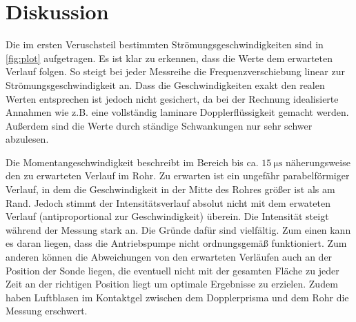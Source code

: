 \section{Diskussion}
\label{sec:Diskussion}
Die im ersten Veruschsteil bestimmten Strömungsgeschwindigkeiten sind in \autoref{fig:plot} aufgetragen.
Es ist klar zu erkennen, dass die Werte dem erwarteten Verlauf folgen.
So steigt bei jeder Messreihe die Frequenzverschiebung linear zur Strömungsgeschwindigkeit an.
Dass die Geschwindigkeiten exakt den realen Werten entsprechen ist jedoch nicht
gesichert, da bei der Rechnung idealisierte Annahmen wie z.B. eine vollständig laminare
Dopplerflüssigkeit gemacht werden. Außerdem sind die Werte durch ständige Schwankungen nur sehr schwer abzulesen.


Die Momentangeschwindigkeit beschreibt im Bereich bis ca. $\qty{15}{\micro\second}$ näherungsweise den zu erwarteten Verlauf im
Rohr. Zu erwarten ist ein ungefähr parabelförmiger Verlauf, in dem die Geschwindigkeit in der Mitte des Rohres größer ist als am Rand.  
Jedoch stimmt der Intensitätsverlauf absolut nicht mit dem 
erwateten Verlauf (antiproportional zur Geschwindigkeit) überein. Die Intensität steigt während der Messung stark an.
Die Gründe dafür sind vielfältig.
Zum einen kann es daran liegen, dass die Antriebspumpe nicht ordnungsgemäß funktioniert.
Zum anderen können die Abweichungen von den erwarteten Verläufen auch an der Position der Sonde liegen, die eventuell nicht mit der
gesamten Fläche zu jeder Zeit an der richtigen Position liegt um optimale Ergebnisse zu erzielen.
Zudem haben Luftblasen im Kontaktgel zwischen dem Dopplerprisma und dem Rohr die Messung erschwert.